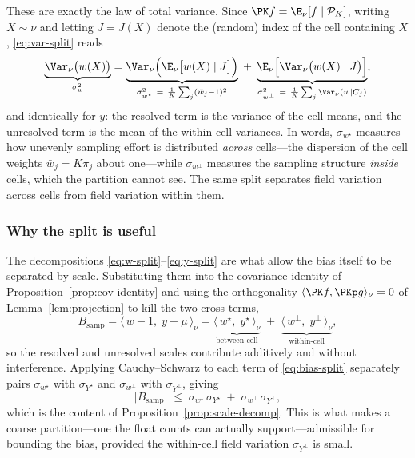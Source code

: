 These are exactly the law of total variance. Since
$\PK f=\E_\nu[f\mid\mathcal{P}_K]$, writing $X\sim\nu$ and letting
$J=J(X)$ denote the (random) index of the cell containing $X$,
\eqref{eq:var-split} reads
\[
  \underbrace{\Var_\nu\big(w(X)\big)}_{\sigma_w^2}
  =\underbrace{\Var_\nu\Big(\E_\nu\big[w(X)\mid J\big]\Big)}_{
      \sigma_{w^{\star}}^2\ =\ \frac1K \sum_j (\bar w_j-1)^2}
  \;+\;
  \underbrace{\E_\nu\Big[\Var_\nu\big(w(X)\mid J\big)\Big]}_{
      \sigma_{w^{\perp}}^2\ =\ \frac1K \sum_j \Var_\nu(w\mid C_j)} ,
\]
and identically for $y$: the resolved term is the variance of the cell
means, and the unresolved term is the mean of the within-cell variances.
In words, $\sigma_{w^{\star}}$ measures how unevenly sampling effort is
distributed \emph{across} cells---the dispersion of the cell weights
$\bar w_j=K\pi_j$ about one---while $\sigma_{w^{\perp}}$ measures the
sampling structure \emph{inside} cells, which the partition cannot see.
The same split separates field variation across cells from field
variation within them.

\subsubsection*{Why the split is useful}

The decompositions \eqref{eq:w-split}--\eqref{eq:y-split} are what allow
the bias itself to be separated by scale. Substituting them into the
covariance identity of Proposition~\ref{prop:cov-identity} and using the
orthogonality $\langle \PK f,\PKp g\rangle_\nu=0$ of
Lemma~\ref{lem:projection} to kill the two cross terms,
\begin{equation}
  B_{\mathrm{samp}}
  =\big\langle\, w-1,\; y-\mu \,\big\rangle_\nu
  =\underbrace{\big\langle\, w^{\star},\; y^{\star} \,\big\rangle_\nu}_{\text{between-cell}}
  \;+\;\underbrace{\big\langle\, w^{\perp},\; y^{\perp} \,\big\rangle_\nu}_{\text{within-cell}} ,
  \label{eq:bias-split}
\end{equation}
so the resolved and unresolved scales contribute additively and without
interference. Applying Cauchy--Schwarz to each term of
\eqref{eq:bias-split} separately pairs $\sigma_{w^{\star}}$ with
$\sigma_{Y^{\star}}$ and $\sigma_{w^{\perp}}$ with $\sigma_{Y^{\perp}}$,
giving
\[
  \big|B_{\mathrm{samp}}\big|
  \;\le\;\sigma_{w^{\star}}\,\sigma_{Y^{\star}}
  \;+\;\sigma_{w^{\perp}}\,\sigma_{Y^{\perp}} ,
\]
which is the content of Proposition~\ref{prop:scale-decomp}. This is what
makes a coarse partition---one the float counts can actually
support---admissible for bounding the bias, provided the within-cell
field variation $\sigma_{Y^{\perp}}$ is small.


